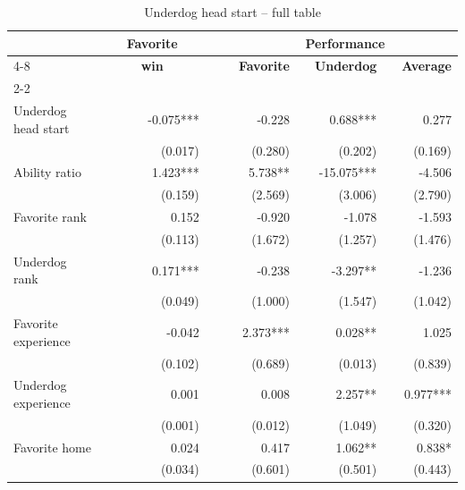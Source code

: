 \documentclass[11pt,a4paper]{article}
\begin{document}
	\begin{table}[H]
		\centering
		\caption{Underdog head start -- full table} 
		\label{tab:table_app_head}
		\begin{tabular}{l r r r r r r r} 
			\toprule
            \toprule
			& \multicolumn{1}{c}{\textbf{~~~Favorite~~~}} & ~~ &  \multicolumn{5}{c}{\textbf{Performance}}  \\
            \cline{4-8}
   			& \multicolumn{1}{c}{\textbf{win}} &  &  \multicolumn{1}{c}{\textbf{Favorite}} & & \multicolumn{1}{c}{\textbf{Underdog}} & & \multicolumn{1}{c}{\textbf{Average}}\\
            \cline{2-2} \cline{4-4} \cline{6-6} \cline{8-8} \vspace{0.7em}\\  
            
			Underdog head start  ~~~  & -0.075***    & & -0.228    & & 0.688***  & & 0.277    \\
			                         & (0.017)      & & (0.280)   & & (0.202)   & & (0.169)  \\
			Ability ratio            & 1.423***     & &  5.738**  & & -15.075*** & & -4.506  \\
			                         & (0.159)      & & (2.569)   & & (3.006)   & & (2.790)  \\
			Favorite rank            & 0.152        & & -0.920    & & -1.078    & & -1.593   \\
			                         & (0.113)      & & (1.672)   & & (1.257)   & & (1.476)  \\
			Underdog rank            &  0.171***    & & -0.238    & & -3.297**  & & -1.236   \\
			                         & (0.049)      & & (1.000)   & & (1.547)   & & (1.042)  \\
			Favorite experience      & -0.042       & & 2.373***  & & 0.028**   & & 1.025    \\
			                         & (0.102)      & & (0.689)   & & (0.013)   & & (0.839)  \\
			Underdog experience      &  0.001       & &  0.008    & & 2.257**   & & 0.977*** \\
			                         & (0.001)      & & (0.012)   & & (1.049)   & & (0.320)  \\
			Favorite home            &  0.024       & &  0.417    & & 1.062**   & & 0.838*   \\
			                         & (0.034)      & & (0.601)   & & (0.501)   & & (0.443)  \\

\end{tabular}
\end{table}
\end{document}

